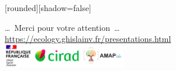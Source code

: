 
{
  [rounded][shadow=false]
  \begin{frame}[plain]
    \begin{block}{}
      \begin{center}
        \ldots~Merci pour votre attention~\ldots \\
        \url{https://ecology.ghislainv.fr/presentations.html} \\
        \includegraphics[width=0.4\textwidth]{figs/partners_logos}
      \end{center}
    \end{block}
  \end{frame}
}
